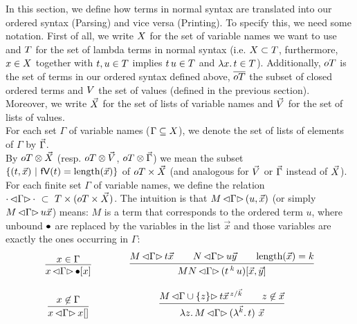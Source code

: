 \documentclass[submission,copyright,creativecommons]{eptcs}
\begin{document}
In this section, we define how terms in normal syntax are translated into our ordered syntax (Parsing) and vice versa (Printing). 
To specify this, we need some notation. 
First of all, we write $X$ for the set of variable names we want to use and $T$ for the set of lambda terms in normal syntax (i.e. $X \subset T$, furthermore, $x \in X$ together with $t, u \in T$ implies $t \, u \in T$ and $\lambda {x}. \, t \in T$). Additionally, $oT$ is the set of terms in our ordered syntax defined above, $\overline{oT}$ the subset of closed ordered terms and $V$ the set of values (defined in the previous section).
Moreover, we write $\vec {X}$ for the set of lists of variable names and $\vec {V}$ for the set of lists of values. 
\\
For each set $\Gamma$ of variable names ($\Gamma \subseteq X$), we denote the set of lists of elements of $\Gamma$ by $\vec \Gamma$. 
\\
By $oT \otimes \vec {X}$ (resp. $oT \otimes \vec {V}$, $oT \otimes \vec \Gamma$) we mean the subset $\{(t, \vec x) \ | \ \mathsf{fV}(t) = \mbox{length}(\vec x) \}$ of $oT \times \vec {X}$ (and analogous for $\vec {V}$ or $\vec \Gamma$ instead of $\vec {X}$).
\\
For each finite %
set $\Gamma$ of variable names, we define the relation
$\cdot \, { \mathord{\lhd} {\Gamma} \mathord{\rhd} } \, \cdot \ \subset \  T \times (oT \times \vec {X})$.
The intuition is that $M \, { \mathord{\lhd} {\Gamma} \mathord{\rhd} } \, (u, \vec x)$ (or simply $M \, { \mathord{\lhd} {\Gamma} \mathord{\rhd} } \, u \vec x$) means: $M$ is a term that corresponds to the ordered term $u$, where unbound $\mathord{\bullet}$ are replaced by the variables in the list $\vec x$ and those variables are exactly the ones occurring in $\Gamma$:
\[
\begin{array}{c@{\qquad\qquad} c}
\infru{x \in \Gamma}{\parse x \Gamma {\ovar \ve x}}
&
\infru{ {\parse M \Gamma {t \vec x}} \qquad {\parse N \Gamma {u \vec y}} \qquad {\length{\vec x} = k} } {\parse {MN} {\Gamma} {(\ApO t k u) [\vec x, \vec y]} } 
\\ \\
\infru{x \not\in \Gamma}{\parse x \Gamma {x \emptyVec}}
&
\infru{ 
         {\parse M { \Gamma \cup \{z\} } {       t \multiinsert{\vec x}{\vec k}{z}   }} 
          \qquad 
          z \not\in \vec x  }
          {\parse {\LaA z M} {\Gamma} {(\LaO {\vec{k}} t) \ \vec x}}
\end{array}
\]
\end{document}
